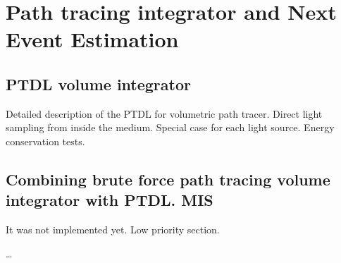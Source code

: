 \chapter{Path tracing integrator and Next Event Estimation}
\label{chapter:ptdl}



\section{PTDL volume integrator}

Detailed description of the PTDL for volumetric path tracer.
Direct light sampling from inside the medium. Special case for each light
source. Energy conservation tests.


\section{Combining brute force path tracing volume integrator with PTDL. MIS}
It was not implemented yet. Low priority section.

\ldots